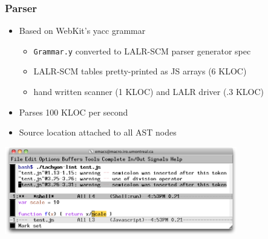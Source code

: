 \begin{frame}
\frametitle{\bf Parser}

  \begin{itemize}

  \item Based on WebKit's yacc grammar
    \begin{itemize}
    \item {\tt Grammar.y} converted to LALR-SCM parser generator spec
    \item LALR-SCM tables pretty-printed as JS arrays (6 KLOC)
    \item hand written scanner (1 KLOC) and LALR driver (.3 KLOC)
    \end{itemize}
    \smallskip

  \item Parses 100 KLOC per second
    \smallskip

  \item Source location attached to all AST nodes

  \end{itemize}

  \begin{center}
    \includegraphics[height=1.5in]{images/tachyon-lint.png}
  \end{center}

\end{frame}

